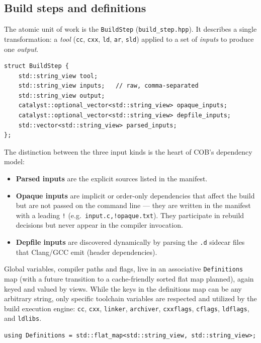 \documentclass[11pt]{article}
\begin{document}
\subsection{Build steps and definitions}

The atomic unit of work is the \lstinline|BuildStep| (\texttt{build\_step.hpp}).
It describes a single transformation: a \emph{tool} (\texttt{cc}, \texttt{cxx},
\texttt{ld}, \texttt{ar}, \texttt{sld}) applied to a set of \emph{inputs} to
produce one \emph{output}.

\begin{lstlisting}
struct BuildStep {
    std::string_view tool;
    std::string_view inputs;   // raw, comma-separated
    std::string_view output;
    catalyst::optional_vector<std::string_view> opaque_inputs;
    catalyst::optional_vector<std::string_view> depfile_inputs;
    std::vector<std::string_view> parsed_inputs;
};
\end{lstlisting}

The distinction between the three input kinds is the heart of COB's
dependency model:

\begin{itemize}
  \item \textbf{Parsed inputs} are the explicit sources listed in the manifest.
  \item \textbf{Opaque inputs} are implicit or order-only dependencies that
  affect the build but are not passed on the command line --- they are written
  in the manifest with a leading \lstinline|!|
  (e.g.\ \lstinline|input.c,!opaque.txt|).
  They participate in rebuild decisions but never appear in the compiler
  invocation.
  \item \textbf{Depfile inputs} are discovered dynamically by parsing the
  \texttt{.d} sidecar files that Clang/GCC emit (header dependencies).
\end{itemize}

Global variables, compiler paths and flags, live in an associative
\lstinline|Definitions| map (with a future transition to a cache-friendly sorted flat map planned), again keyed and
valued by views. While the keys in the definitions map can be any arbitrary string, only specific toolchain variables
are respected and utilized by the build execution engine: \texttt{cc}, \texttt{cxx}, \texttt{linker}, \texttt{archiver}, \texttt{cxxflags}, \texttt{cflags}, \texttt{ldflags}, and \texttt{ldlibs}.

\begin{lstlisting}
using Definitions = std::flat_map<std::string_view, std::string_view>;
\end{lstlisting}
\end{document}
